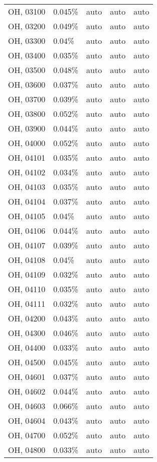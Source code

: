 \begin{longtable}[]{@{}lllll@{}}
OH, 03100 & 0.045\% & auto & auto & auto \\
OH, 03200 & 0.049\% & auto & auto & auto \\
OH, 03300 & 0.04\% & auto & auto & auto \\
OH, 03400 & 0.035\% & auto & auto & auto \\
OH, 03500 & 0.048\% & auto & auto & auto \\
OH, 03600 & 0.037\% & auto & auto & auto \\
OH, 03700 & 0.039\% & auto & auto & auto \\
OH, 03800 & 0.052\% & auto & auto & auto \\
OH, 03900 & 0.044\% & auto & auto & auto \\
OH, 04000 & 0.052\% & auto & auto & auto \\
OH, 04101 & 0.035\% & auto & auto & auto \\
OH, 04102 & 0.034\% & auto & auto & auto \\
OH, 04103 & 0.035\% & auto & auto & auto \\
OH, 04104 & 0.037\% & auto & auto & auto \\
OH, 04105 & 0.04\% & auto & auto & auto \\
OH, 04106 & 0.044\% & auto & auto & auto \\
OH, 04107 & 0.039\% & auto & auto & auto \\
OH, 04108 & 0.04\% & auto & auto & auto \\
OH, 04109 & 0.032\% & auto & auto & auto \\
OH, 04110 & 0.035\% & auto & auto & auto \\
OH, 04111 & 0.032\% & auto & auto & auto \\
OH, 04200 & 0.043\% & auto & auto & auto \\
OH, 04300 & 0.046\% & auto & auto & auto \\
OH, 04400 & 0.033\% & auto & auto & auto \\
OH, 04500 & 0.045\% & auto & auto & auto \\
OH, 04601 & 0.037\% & auto & auto & auto \\
OH, 04602 & 0.044\% & auto & auto & auto \\
OH, 04603 & 0.066\% & auto & auto & auto \\
OH, 04604 & 0.043\% & auto & auto & auto \\
OH, 04700 & 0.052\% & auto & auto & auto \\
OH, 04800 & 0.033\% & auto & auto & auto \\

\end{longtable}

